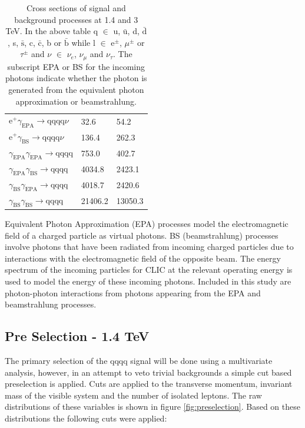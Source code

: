 \begin{table}[h!]
\begin{tabular}{ l l l}
$\text{e}^{+}\gamma_{\text{EPA}} \rightarrow \text{qqqq}\nu$ & 32.6 & 54.2 \\
$\text{e}^{+}\gamma_{\text{BS}} \rightarrow \text{qqqq}\nu$ & 136.4 & 262.3 \\
$\gamma_{\text{EPA}}\gamma_{\text{EPA}} \rightarrow \text{qqqq}$ & 753.0 & 402.7 \\
$\gamma_{\text{EPA}}\gamma_{\text{BS}} \rightarrow \text{qqqq}$ & 4034.8 & 2423.1 \\
$\gamma_{\text{BS}}\gamma_{\text{EPA}} \rightarrow \text{qqqq}$ & 4018.7 & 2420.6 \\
$\gamma_{\text{BS}}\gamma_{\text{BS}} \rightarrow \text{qqqq}$ & 21406.2 & 13050.3 \\
\hline
\end{tabular}
\caption[]{Cross sections of signal and background processes at 1.4 and 3 TeV. In the above table q $\in$ u, $\bar{\text{u}}$, d, $\bar{\text{d}}$, s, $\bar{\text{s}}$, c, $\bar{\text{c}}$, b or $\bar{\text{b}}$ while l $\in$ $\text{e}^{\pm}$, $\mu^{\pm}$ or $\tau^{\pm}$ and $\nu$ $\in$ $\nu_{e}$, $\nu_{\mu}$ and $\nu_{\tau}$.  The subscript EPA or BS for the incoming photons indicate whether the photon is generated from the equivalent photon approximation or beamstrahlung.}
\label{table:crosssectionfull}
\end{table}

Equivalent Photon Approximation (EPA) processes model the electromagnetic field of a charged particle as virtual photons.  BS (beamstrahlung) processes involve photons that have been radiated from incoming charged particles due to interactions with the electromagnetic field of the opposite beam.   The energy spectrum of the incoming particles for CLIC at the relevant operating energy is used to model the energy of these incoming photons.  Included in this study are photon-photon interactions from photons appearing from the EPA and beamstrahlung processes.

\subsection{Pre Selection - 1.4 TeV}
\label{sec:preselection1400GeV}
The primary selection of the \nu{\nu}qqqq signal will be done using a multivariate analysis, however, in an attempt to veto trivial backgrounds a simple cut based preselection is applied. Cuts are applied to the transverse momentum, invariant mass of the visible system and the number of isolated leptons. The raw distributions of these variables is
shown in figure \ref{fig:preselection}. Based on these distributions the following cuts were applied:

